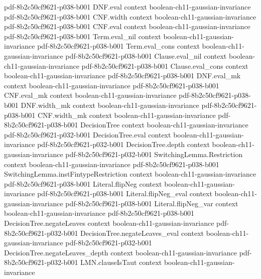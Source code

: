 \begin{theorem}
  {pdf-8b2c50cf9621-p038-b001}
\proofstep
  {DNF.eval}
  {context}
  {boolean-ch11-gaussian-invariance}
  {pdf-8b2c50cf9621-p038-b001}
\proofstep
  {CNF.width}
  {context}
  {boolean-ch11-gaussian-invariance}
  {pdf-8b2c50cf9621-p038-b001}
\proofstep
  {CNF.eval}
  {context}
  {boolean-ch11-gaussian-invariance}
  {pdf-8b2c50cf9621-p038-b001}
\proofstep
  {Term.eval_nil}
  {context}
  {boolean-ch11-gaussian-invariance}
  {pdf-8b2c50cf9621-p038-b001}
\proofstep
  {Term.eval_cons}
  {context}
  {boolean-ch11-gaussian-invariance}
  {pdf-8b2c50cf9621-p038-b001}
\proofstep
  {Clause.eval_nil}
  {context}
  {boolean-ch11-gaussian-invariance}
  {pdf-8b2c50cf9621-p038-b001}
\proofstep
  {Clause.eval_cons}
  {context}
  {boolean-ch11-gaussian-invariance}
  {pdf-8b2c50cf9621-p038-b001}
\proofstep
  {DNF.eval_mk}
  {context}
  {boolean-ch11-gaussian-invariance}
  {pdf-8b2c50cf9621-p038-b001}
\proofstep
  {CNF.eval_mk}
  {context}
  {boolean-ch11-gaussian-invariance}
  {pdf-8b2c50cf9621-p038-b001}
\proofstep
  {DNF.width_mk}
  {context}
  {boolean-ch11-gaussian-invariance}
  {pdf-8b2c50cf9621-p038-b001}
\proofstep
  {CNF.width_mk}
  {context}
  {boolean-ch11-gaussian-invariance}
  {pdf-8b2c50cf9621-p038-b001}
\proofstep
  {DecisionTree}
  {context}
  {boolean-ch11-gaussian-invariance}
  {pdf-8b2c50cf9621-p032-b001}
\proofstep
  {DecisionTree.eval}
  {context}
  {boolean-ch11-gaussian-invariance}
  {pdf-8b2c50cf9621-p032-b001}
\proofstep
  {DecisionTree.depth}
  {context}
  {boolean-ch11-gaussian-invariance}
  {pdf-8b2c50cf9621-p032-b001}
\proofstep
  {SwitchingLemma.Restriction}
  {context}
  {boolean-ch11-gaussian-invariance}
  {pdf-8b2c50cf9621-p038-b001}
\proofstep
  {SwitchingLemma.instFintypeRestriction}
  {context}
  {boolean-ch11-gaussian-invariance}
  {pdf-8b2c50cf9621-p038-b001}
\proofstep
  {Literal.flipNeg}
  {context}
  {boolean-ch11-gaussian-invariance}
  {pdf-8b2c50cf9621-p038-b001}
\proofstep
  {Literal.flipNeg_eval}
  {context}
  {boolean-ch11-gaussian-invariance}
  {pdf-8b2c50cf9621-p038-b001}
\proofstep
  {Literal.flipNeg_var}
  {context}
  {boolean-ch11-gaussian-invariance}
  {pdf-8b2c50cf9621-p038-b001}
\proofstep
  {DecisionTree.negateLeaves}
  {context}
  {boolean-ch11-gaussian-invariance}
  {pdf-8b2c50cf9621-p032-b001}
\proofstep
  {DecisionTree.negateLeaves_eval}
  {context}
  {boolean-ch11-gaussian-invariance}
  {pdf-8b2c50cf9621-p032-b001}
\proofstep
  {DecisionTree.negateLeaves_depth}
  {context}
  {boolean-ch11-gaussian-invariance}
  {pdf-8b2c50cf9621-p032-b001}
\proofstep
  {LMN.clauseIsTaut}
  {context}
  {boolean-ch11-gaussian-invariance}

\end{theorem}
